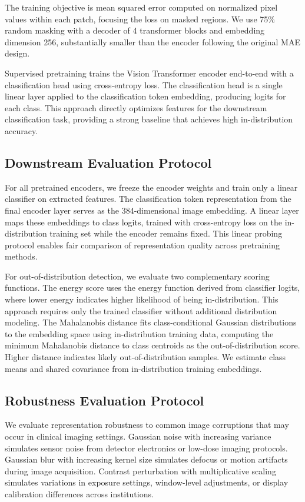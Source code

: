 \documentclass[11pt,a4paper]{article}
\begin{document}
The training objective is mean squared error computed on normalized pixel values within each patch, focusing the loss on masked regions. We use 75\% random masking with a decoder of 4 transformer blocks and embedding dimension 256, substantially smaller than the encoder following the original MAE design.

Supervised pretraining trains the Vision Transformer encoder end-to-end with a classification head using cross-entropy loss. The classification head is a single linear layer applied to the classification token embedding, producing logits for each class. This approach directly optimizes features for the downstream classification task, providing a strong baseline that achieves high in-distribution accuracy.

\subsection{Downstream Evaluation Protocol}

For all pretrained encoders, we freeze the encoder weights and train only a linear classifier on extracted features. The classification token representation from the final encoder layer serves as the 384-dimensional image embedding. A linear layer maps these embeddings to class logits, trained with cross-entropy loss on the in-distribution training set while the encoder remains fixed. This linear probing protocol enables fair comparison of representation quality across pretraining methods.

For out-of-distribution detection, we evaluate two complementary scoring functions. The energy score uses the energy function derived from classifier logits, where lower energy indicates higher likelihood of being in-distribution. This approach requires only the trained classifier without additional distribution modeling. The Mahalanobis distance fits class-conditional Gaussian distributions to the embedding space using in-distribution training data, computing the minimum Mahalanobis distance to class centroids as the out-of-distribution score. Higher distance indicates likely out-of-distribution samples. We estimate class means and shared covariance from in-distribution training embeddings.

\subsection{Robustness Evaluation Protocol}

We evaluate representation robustness to common image corruptions that may occur in clinical imaging settings. Gaussian noise with increasing variance simulates sensor noise from detector electronics or low-dose imaging protocols. Gaussian blur with increasing kernel size simulates defocus or motion artifacts during image acquisition. Contrast perturbation with multiplicative scaling simulates variations in exposure settings, window-level adjustments, or display calibration differences across institutions.
\end{document}
